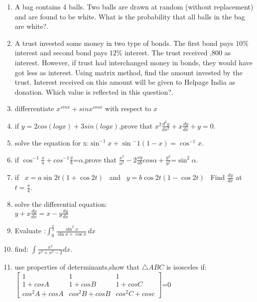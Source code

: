 \documentclass[12pt,-letter paper]{article}
\providecommand{\myvec}[1]{\ensuremath{\begin{bmatrix}#1\end{bmatrix}}}
\begin{document}
\begin{enumerate}
\item  A bag contains $4$ balls. Two balls are drawn at random (without replacement) and are found to be white. What is the probability that all balls in the bag are white?.
\item A trust invested some money in two type of bonds. The first bond pays $10\%$ interest and second bond pays $12\%$ interest. The trust received ,800 as interest. However, if trust had interchanged money in bonds, they would have got  less as interest. Using matrix method, find the amount invested by the trust. Interest received on this amount will be given to Helpage India as donation. Which value is reflected in this question?.
\item differrentiate $x^{sinx}+sinx^{cosx}$ with respect to $x$
\item if $ y=2cos(logx)+3sin(logx)$,prove that $x^2\frac{d^2y}{dx^2}+x\frac{dy}{dx}+y=0$.
\item solve the equation for x:$\sin^{-1}x+\sin{^-1}(1-x) = \cos^{-1}x$.
\item if $\cos^{-1}\frac{x}{a}+cos^{-1}\frac{y}{b}$=$\alpha$,prove that $\frac{x^2}{a^2}-2\frac{xy}{ab}cos\alpha+\frac{y^2}{b^2}$=$\sin^2\alpha$.
\item if \                                                                                                                                     $       x= a \sin 2t (1 + \cos 2t)$                                                                                            \
and
\                                                                                                                                              $y= b \cos 2t (1 - \cos 2t)$                                                                                                   \
Find $\frac{dy}{dx}$ at $ t = \frac{\pi}{4}$.
\item solve the differential equation:\\                                                                                                  $ y + x \frac{dy}{dx} = x - y \frac{dy}{dx}$
	\item Evaluate :$\int_{0}^{\frac{\pi}{2}} \frac{\sin^2 x}{\sin x + \cos x} \, dx$
\item find: $\int \frac{x^2}{x^4+x^2-2}dx.$
\item use properties of determinants,show that $\triangle{ABC}$ is isosceles if:\\
	$\myvec{1 & 1 & 1 \\ 1+cosA & 1+cosB & 1+cosC \\ cos^2A+cosA & cos^2B+cosB & cos^2C+cosc}$=0

\end{enumerate}
\end{document}
